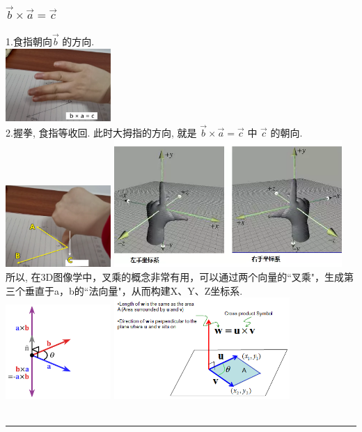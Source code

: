 \documentclass[UTF8]{ctexart}
\begin{document}
\subsubsection{$\vec{b} \times \vec{a} = \vec{c}$}


1.食指朝$向\vec{b}$ 的方向. \\
\includegraphics[width=0.3\textwidth]{img/0085.png}\\

2.握拳, 食指等收回. 此时大拇指的方向, 就是 $\vec{b} \times \vec{a} = \vec{c}$ 中 $\vec{c}$ 的朝向. \\
\includegraphics[width=0.3\textwidth]{img/0086.png}
\includegraphics[width=0.65\textwidth]{img/0090.png}\\

所以, 在3D图像学中，叉乘的概念非常有用，可以通过两个向量的``叉乘"，生成第三个垂直于a，b的``法向量"，从而构建X、Y、Z坐标系. \\

\includegraphics[width=0.3\textwidth]{img/0087.png}
\includegraphics[width=0.5\textwidth]{img/0088.png}\\


~\\
\hrule
~\\
\end{document}

